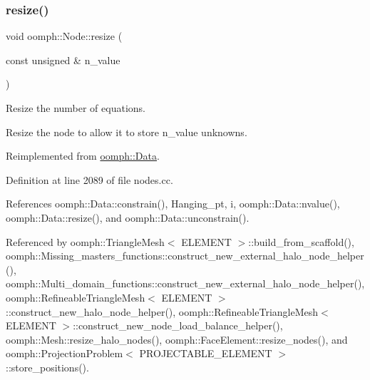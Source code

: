 \mbox{\label{classoomph_1_1Node_ae6598da29d403889020ccd47a2c07cc4}} 
\subsubsection{\texorpdfstring{resize()}{resize()}}
{\footnotesize\ttfamily void oomph\+::\+Node\+::resize (\begin{DoxyParamCaption}\item[{const unsigned \&}]{n\+\_\+value }\end{DoxyParamCaption})\hspace{0.3cm}{\ttfamily [virtual]}}



Resize the number of equations. 

Resize the node to allow it to store n\+\_\+value unknowns. 

Reimplemented from \hyperlink{classoomph_1_1Data_ac68583834c9bef47f5c37c890960e186}{oomph\+::\+Data}.



Definition at line 2089 of file nodes.\+cc.



References oomph\+::\+Data\+::constrain(), Hanging\+\_\+pt, i, oomph\+::\+Data\+::nvalue(), oomph\+::\+Data\+::resize(), and oomph\+::\+Data\+::unconstrain().



Referenced by oomph\+::\+Triangle\+Mesh$<$ E\+L\+E\+M\+E\+N\+T $>$\+::build\+\_\+from\+\_\+scaffold(), oomph\+::\+Missing\+\_\+masters\+\_\+functions\+::construct\+\_\+new\+\_\+external\+\_\+halo\+\_\+node\+\_\+helper(), oomph\+::\+Multi\+\_\+domain\+\_\+functions\+::construct\+\_\+new\+\_\+external\+\_\+halo\+\_\+node\+\_\+helper(), oomph\+::\+Refineable\+Triangle\+Mesh$<$ E\+L\+E\+M\+E\+N\+T $>$\+::construct\+\_\+new\+\_\+halo\+\_\+node\+\_\+helper(), oomph\+::\+Refineable\+Triangle\+Mesh$<$ E\+L\+E\+M\+E\+N\+T $>$\+::construct\+\_\+new\+\_\+node\+\_\+load\+\_\+balance\+\_\+helper(), oomph\+::\+Mesh\+::resize\+\_\+halo\+\_\+nodes(), oomph\+::\+Face\+Element\+::resize\+\_\+nodes(), and oomph\+::\+Projection\+Problem$<$ P\+R\+O\+J\+E\+C\+T\+A\+B\+L\+E\+\_\+\+E\+L\+E\+M\+E\+N\+T $>$\+::store\+\_\+positions().

\mbox{\label{classoomph_1_1Node_a638898508d6adc170afb1a2a203ac707}} 
